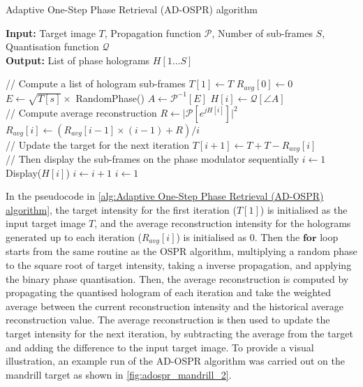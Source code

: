 \begin{algorithm}[H]
  \caption{Adaptive One-Step Phase Retrieval (AD-OSPR) algorithm}\label{alg:Adaptive One-Step Phase Retrieval (AD-OSPR) algorithm}
  \textbf{Input:} Target image $T$, Propagation function $\mathcal{P}$, Number of sub-frames $S$, Quantisation function $\mathcal{Q}$\\
  \textbf{Output:} List of phase holograms $H[1\ldots S]$
  \begin{algorithmic}
    \State // Compute a list of hologram sub-frames
    \State $T[1] \gets T$
    \State $R_{avg}[0] \gets 0$
    \State $E \gets \sqrt{T[s]} \times$ RandomPhase()
    \State $A \gets \mathcal{P}^{-1}[E]$
    \State $H[i] \gets \mathcal{Q}[\angle A]$\\

    \State // Compute average reconstruction
    \State $R \gets \vert \mathcal{P}[e^{jH[i]}] \vert ^2$
    \State $R_{avg}[i] \gets (R_{avg}[i-1] \times (i-1) + R)/i$\\

    \State // Update the target for the next iteration
    \State $T[i+1] \gets T + T - R_{avg}[i]$
    \EndFor\\

    \State // Then display the sub-frames on the phase modulator sequentially
    \State $i\gets 1$
    \State Display($H[i]$)
    \State $i\gets i + 1$
    \State $i\gets 1$
    \EndIf
    \EndWhile
  \end{algorithmic}
\end{algorithm}

In the pseudocode in \cref{alg:Adaptive One-Step Phase Retrieval (AD-OSPR) algorithm}, the target intensity for the first iteration ($T[1]$) is initialised as the input target image $T$, and the average reconstruction intensity for the holograms generated up to each iteration ($R_{avg}[i]$) is initialised as 0. Then the $\textbf{for}$ loop starts from the same routine as the OSPR algorithm, multiplying a random phase to the square root of target intensity, taking a inverse propagation, and applying the binary phase quantisation. Then, the average reconstruction is computed by propagating the quantised hologram of each iteration and take the weighted average between the current reconstruction intensity and the historical average reconstruction value. The average reconstruction is then used to update the target intensity for the next iteration, by subtracting the average from the target and adding the difference to the input target image. To provide a visual illustration, an example run of the AD-OSPR algorithm was carried out on the mandrill target as shown in \cref{fig:adospr_mandrill_2}.

